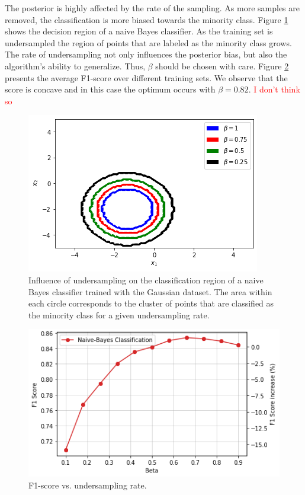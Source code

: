 \documentclass[conference]{IEEEtran}
\begin{document}
		The posterior is highly affected by the rate of the sampling. As more samples are removed, the classification is more biased towards the minority class. Figure \ref{fig:Undersampling_2D_Contour_Classification} shows the decision region of a naive Bayes classifier. As the training set is undersampled the region of points that are labeled as the minority class grows. The rate of undersampling not only influences the posterior bias, but also the algorithm's ability to generalize. Thus, $\beta$ should be chosen with care. Figure \ref{fig:Undersampling_F1_Score} presents the average F1-score over different training sets. We observe that the score is concave and in this case the optimum occurs with $\beta=0.82$. \textcolor{red}{I don't think so}

			\begin{figure}[h]
				\includegraphics[scale=0.45]{Undersampling_2D_Contour_Classification}
				\centering
				\caption{Influence of undersampling on the classification region of a naive Bayes classifier trained with the Gaussian dataset. The area within each circle corresponds to the cluster of points that are classified as the minority class for a given undersampling rate.}
				\label{fig:Undersampling_2D_Contour_Classification}
			\end{figure}
		
			\begin{figure}[h]
				\includegraphics[scale=0.45]{Undersampling_F1_Score}
				\centering
				\caption{F1-score vs. undersampling rate.}
				\label{fig:Undersampling_F1_Score}
			\end{figure}
		
\end{document}
